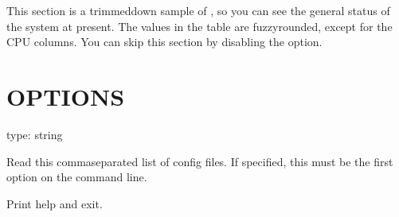 \documentclass[letterpaper,10pt,english]{sphinxmanual}
\begin{document}
This section is a trimmed\sphinxhyphen{}down sample of , so you can see the
general status of the system at present. The values in the table are
fuzzy\sphinxhyphen{}rounded, except for the CPU columns.  You can skip this section by
disabling the {\hyperref[\detokenize{mariadb-system-summary:cmdoption-mariadb-system-summary-summarize-processes}]{}} option.


\section{OPTIONS}
\label{\detokenize{mariadb-system-summary:options}}

\begin{fulllineitems}
\label{\detokenize{mariadb-system-summary:cmdoption-mariadb-system-summary-config}}
type: string

Read this comma\sphinxhyphen{}separated list of config files.  If specified, this must be the
first option on the command line.

\end{fulllineitems}


\begin{fulllineitems}
\label{\detokenize{mariadb-system-summary:cmdoption-mariadb-system-summary-help}}
Print help and exit.

\end{fulllineitems}
\end{document}
